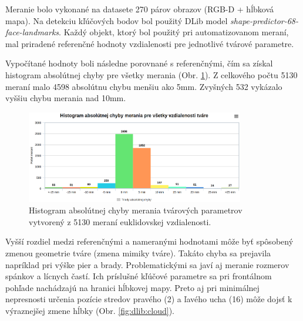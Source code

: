 \vskip 0.2in
Meranie bolo vykonané na datasete 270 párov obrazov (RGB-D + hĺbková mapa). Na detekciu kľúčových bodov bol použitý DLib model \textit{shape-predictor-68-face-landmarks}. Každý objekt, ktorý bol použitý pri automatizovanom meraní, mal priradené referenčné hodnoty vzdialenosti pre jednotlivé tvárové parametre. 


Vypočítané hodnoty boli následne porovnané s referenčnými, čím sa získal histogram absolútnej chyby pre všetky merania (Obr. \ref{fig:histogram}). Z celkového počtu 5130 meraní malo 4598 absolútnu chybu menšiu ako 5mm. Zvyšných 532 vykázalo vyššiu chybu merania nad 10mm. 

\begin{figure}[H]
	\centering
	\includegraphics[width=0.85\textwidth]{figures/plot.png}
	\caption{Histogram absolútnej chyby merania tvárových parametrov vytvorený z 5130 meraní euklidovskej vzdialenosti.}
	\label{fig:histogram}
\end{figure}

Vyšší rozdiel medzi referenčnými a nameranými hodnotami môže byť spôsobený zmenou geometrie tváre (zmena mimiky tváre). Takáto chyba sa prejavila napríklad pri výške pier a brady. Problematickými sa javí aj meranie rozmerov spánkov a lícnych častí. Ich príslušné kľúčové parametre sa pri frontálnom pohľade nachádzajú na hranici hĺbkovej mapy. Preto aj pri minimálnej nepresnosti určenia pozície stredov pravého (2) a ľavého ucha (16) môže dojsť k výraznejšej zmene hĺbky (Obr. \ref{fig:dlib:cloud}). 

